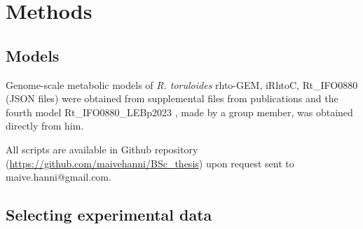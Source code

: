 \chapter{Methods}


\section{Models}

Genome-scale metabolic models of \textit{R. toruloides} rhto-GEM, iRhtoC, Rt\_IFO0880 (JSON files) were obtained from supplemental
files from publications \cite{Tiukova2019, Dinh2019, Kim2021} and the fourth model Rt\_IFO0880\_LEBp2023 \cite{DeBiaggi2023}, 
made by a group member, was obtained directly from him. 

All scripts are available in Github repository (\url{https://github.com/maivehanni/BSc_thesis}) upon request sent to maive.hanni@gmail.com.


\section{Selecting experimental data} \label{Exp_data}

